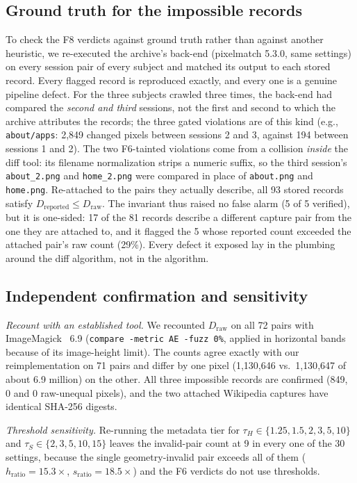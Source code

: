 \documentclass[conference]{IEEEtran}
\newcommand{\Dr}{D_{\mathrm{reported}}}
\newcommand{\Dw}{D_{\mathrm{raw}}}
\begin{document}
\subsection{Ground truth for the impossible records}\label{sec:root}
To check the F8 verdicts against ground truth rather than against another heuristic, we re-executed the archive's back-end (pixelmatch 5.3.0, same settings) on every session pair of every subject and matched its output to each stored record. Every flagged record is reproduced exactly, and every one is a genuine pipeline defect. For the three subjects crawled three times, the back-end had compared the \emph{second and third} sessions, not the first and second to which the archive attributes the records; the three gated violations are of this kind (e.g., \texttt{about/apps}: 2,849 changed pixels between sessions 2 and 3, against 194 between sessions 1 and 2). The two F6-tainted violations come from a collision \emph{inside} the diff tool: its filename normalization strips a numeric suffix, so the third session's \texttt{about\_2.png} and \texttt{home\_2.png} were compared in place of \texttt{about.png} and \texttt{home.png}. Re-attached to the pairs they actually describe, all 93 stored records satisfy $\Dr\le\Dw$. The invariant thus raised no false alarm (5 of 5 verified), but it is one-sided: 17 of the 81 records describe a different capture pair from the one they are attached to, and it flagged the 5 whose reported count exceeded the attached pair's raw count (29\%). Every defect it exposed lay in the plumbing around the diff algorithm, not in the algorithm.

\subsection{Independent confirmation and sensitivity}\label{sec:sens}
\textit{Recount with an established tool.} We recounted $\Dw$ on all 72 pairs with ImageMagick~\cite{imagemagick} 6.9 (\texttt{compare -metric AE -fuzz 0\%}, applied in horizontal bands because of its image-height limit). The counts agree exactly with our reimplementation on 71 pairs and differ by one pixel (1{,}130{,}646 vs.\ 1{,}130{,}647 of about 6.9 million) on the other. All three impossible records are confirmed (849, 0 and 0 raw-unequal pixels), and the two attached Wikipedia captures have identical SHA-256 digests.

\textit{Threshold sensitivity.} Re-running the metadata tier for $\tau_H\in\{1.25,1.5,2,3,5,10\}$ and $\tau_S\in\{2,3,5,10,15\}$ leaves the invalid-pair count at 9 in every one of the 30 settings, because the single geometry-invalid pair exceeds all of them ($h_{\mathrm{ratio}}=15.3\times$, $s_{\mathrm{ratio}}=18.5\times$) and the F6 verdicts do not use thresholds.
\end{document}
